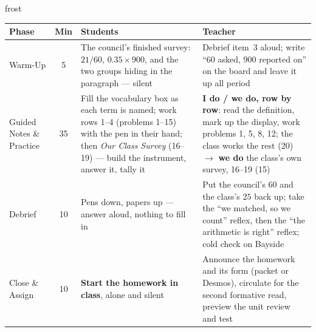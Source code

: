 \documentclass[10pt]{article}
\begin{document}
\begin{fixedskillbox}{frost}
\renewcommand{\arraystretch}{1.25}
\begin{tabularx}{\linewidth}{@{}l c X X@{}}
\textbf{Phase} & \textbf{Min} & \textbf{Students} & \textbf{Teacher} \\
\hline
Warm-Up & 5 & The council's finished survey: $21/60$, $0.35 \times 900$, and the two groups
  hiding in the paragraph --- silent & Debrief item~3 aloud; write ``$60$ asked, $900$ reported
  on'' on the board and leave it up all period \\
Guided Notes \& Practice & 35 & Fill the vocabulary box as each term is named; work rows 1--4
  (problems 1--15) with the pen in their hand; then \emph{Our Class Survey} (16--19) --- build
  the instrument, answer it, tally it & \textbf{I do / we do, row by row}: read the definition,
  mark up the display, work problems 1, 5, 8, 12; the class works the rest (20) $\to$ \textbf{we
  do} the class's own survey, 16--19 (15) \\
Debrief & 10 & Pens down, papers up --- answer aloud, nothing to fill in & Put the council's $60$
  and the class's $25$ back up; take the ``we matched, so we count'' reflex, then the
  ``the arithmetic is right'' reflex; cold check on Bayside \\
Close \& Assign & 10 & \textbf{Start the homework in class}, alone and silent & Announce the
  homework and its form (packet or Desmos), circulate for the second formative read, preview
  the unit review and test \\
\end{tabularx}
\end{fixedskillbox}
\end{document}
